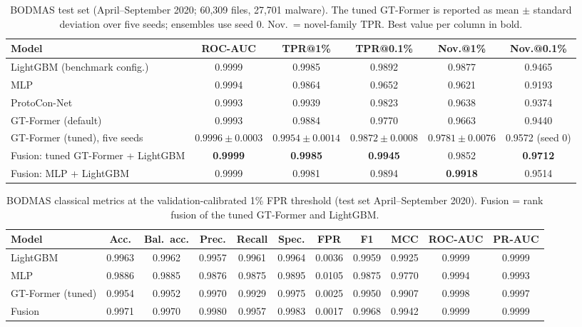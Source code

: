 \documentclass[fleqn,10pt]{wlscirep}
\makeatletter
\newcommand{\gtf}{GT\mbox{-}Former}
\newcommand{\lgbm}{LightGBM}
\newcommand{\tprat}[1]{TPR@#1\%}
\makeatother
\begin{document}
\begin{table}[!htbp]
\centering
\scriptsize
\setlength{\tabcolsep}{2.5pt}
\caption{BODMAS test set (April--September 2020; 60,309 files, 27,701 malware). The tuned \gtf{} is reported as mean $\pm$ standard deviation over five seeds; ensembles use seed 0. Nov.\ = novel-family TPR. Best value per column in bold.}
\label{tab:bodmas}
\begin{tabular}{lccccc}
\toprule
Model & ROC-AUC & \tprat{1} & \tprat{0.1} & Nov.@1\% & Nov.@0.1\% \\
\midrule
\lgbm{} (benchmark config.) & 0.9999 & 0.9985 & 0.9892 & 0.9877 & 0.9465 \\
MLP & 0.9994 & 0.9864 & 0.9652 & 0.9621 & 0.9193 \\
ProtoCon-Net & 0.9993 & 0.9939 & 0.9823 & 0.9638 & 0.9374 \\
\gtf{} (default) & 0.9993 & 0.9884 & 0.9770 & 0.9663 & 0.9440 \\
\gtf{} (tuned), five seeds & $0.9996 \pm 0.0003$ & $0.9954 \pm 0.0014$ & $0.9872 \pm 0.0008$ & $0.9781 \pm 0.0076$ & 0.9572 (seed 0) \\
Fusion: tuned \gtf{} + \lgbm{} & \textbf{0.9999} & \textbf{0.9985} & \textbf{0.9945} & 0.9852 & \textbf{0.9712} \\
Fusion: MLP + \lgbm{} & 0.9999 & 0.9981 & 0.9894 & \textbf{0.9918} & 0.9514 \\
\bottomrule
\end{tabular}
\end{table}

\begin{table}[!htbp]
\centering
\scriptsize
\setlength{\tabcolsep}{2.5pt}
\caption{BODMAS classical metrics at the validation-calibrated 1\% FPR threshold (test set April--September 2020). Fusion = rank fusion of the tuned \gtf{} and \lgbm{}.}
\label{tab:cls-bodmas}
\begin{tabular}{lcccccccccc}
\toprule
Model & Acc. & Bal.\ acc. & Prec. & Recall & Spec. & FPR & F1 & MCC & ROC-AUC & PR-AUC \\
\midrule
\lgbm{} & 0.9963 & 0.9962 & 0.9957 & 0.9961 & 0.9964 & 0.0036 & 0.9959 & 0.9925 & 0.9999 & 0.9999 \\
MLP & 0.9886 & 0.9885 & 0.9876 & 0.9875 & 0.9895 & 0.0105 & 0.9875 & 0.9770 & 0.9994 & 0.9993 \\
\gtf{} (tuned) & 0.9954 & 0.9952 & 0.9970 & 0.9929 & 0.9975 & 0.0025 & 0.9950 & 0.9907 & 0.9998 & 0.9997 \\
Fusion & 0.9971 & 0.9970 & 0.9980 & 0.9957 & 0.9983 & 0.0017 & 0.9968 & 0.9942 & 0.9999 & 0.9999 \\
\bottomrule
\end{tabular}
\end{table}
\end{document}

